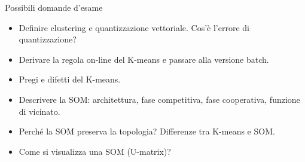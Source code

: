 \begin{boxquestion}{Possibili domande d'esame}

\begin{itemize}
\tightlist
\item
  Definire clustering e quantizzazione vettoriale. Cos'è l'errore di
  quantizzazione?
\item
  Derivare la regola on-line del K-means e passare alla versione batch.
\item
  Pregi e difetti del K-means.
\item
  Descrivere la SOM: architettura, fase competitiva, fase cooperativa,
  funzione di vicinato.
\item
  Perché la SOM preserva la topologia? Differenze tra K-means e SOM.
\item
  Come si visualizza una SOM (U-matrix)?
\end{itemize}

\end{boxquestion}
